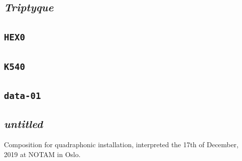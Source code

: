 \documentclass{book}
\begin{document}
\makeatletter
{}
\makeatother

\begin{mdframed}[style=stylesec]
\section{\textit{Triptyque}}
\label{tript}
\smallskip
\end{mdframed}


\newpage

\begin{mdframed}[style=stylesec]
\section{\texttt{HEX0}}
\label{hex0}
\smallskip
\end{mdframed}


\bigskip

\begin{mdframed}[style=stylesec]
\section{\texttt{K540}}
\label{k540}
\smallskip
\end{mdframed}


\bigskip
\bigskip

\begin{mdframed}[style=stylesec]
\section{\texttt{data-01}}
\label{d01}
\smallskip
\end{mdframed}


\bigskip
\bigskip

\begin{mdframed}[style=stylesec]
\section{\textit{untitled}}
\label{scp}
\smallskip
\end{mdframed}

\bigskip

Composition for quadraphonic installation, interpreted the 17th of December, 2019 at NOTAM in Oslo.

\bigskip
\end{document}
